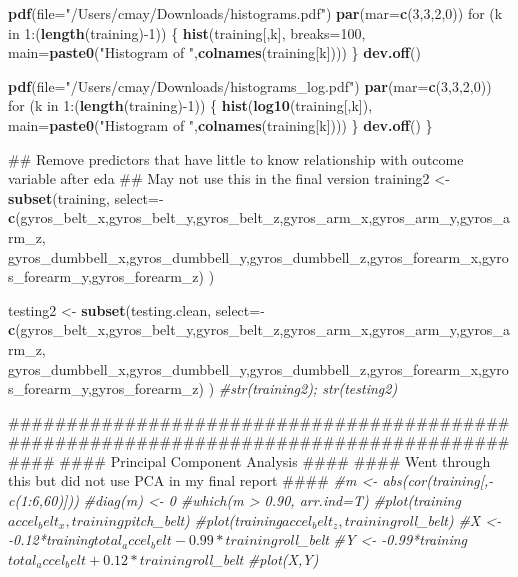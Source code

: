 \documentclass[]{article}
\newenvironment{Shaded}{\begin{snugshade}}{\end{snugshade}}
\newcommand{\KeywordTok}[1]{\textcolor[rgb]{0.13,0.29,0.53}{\textbf{{#1}}}}
\newcommand{\DataTypeTok}[1]{\textcolor[rgb]{0.13,0.29,0.53}{{#1}}}
\newcommand{\DecValTok}[1]{\textcolor[rgb]{0.00,0.00,0.81}{{#1}}}
\newcommand{\StringTok}[1]{\textcolor[rgb]{0.31,0.60,0.02}{{#1}}}
\newcommand{\CommentTok}[1]{\textcolor[rgb]{0.56,0.35,0.01}{\textit{{#1}}}}
\newcommand{\NormalTok}[1]{{#1}}
\begin{document}
\begin{Shaded}
\begin{Highlighting}[]
  \KeywordTok{pdf}\NormalTok{(}\DataTypeTok{file=}\StringTok{"/Users/cmay/Downloads/histograms.pdf"}\NormalTok{)}
  \KeywordTok{par}\NormalTok{(}\DataTypeTok{mar=}\KeywordTok{c}\NormalTok{(}\DecValTok{3}\NormalTok{,}\DecValTok{3}\NormalTok{,}\DecValTok{2}\NormalTok{,}\DecValTok{0}\NormalTok{))}
  \NormalTok{for (k in }\DecValTok{1}\NormalTok{:(}\KeywordTok{length}\NormalTok{(training)-}\DecValTok{1}\NormalTok{)) \{}
    \KeywordTok{hist}\NormalTok{(training[,k], }\DataTypeTok{breaks=}\DecValTok{100}\NormalTok{, }\DataTypeTok{main=}\KeywordTok{paste0}\NormalTok{(}\StringTok{"Histogram of "}\NormalTok{,}\KeywordTok{colnames}\NormalTok{(training[k])))}
  \NormalTok{\}}
  \KeywordTok{dev.off}\NormalTok{()}
  
  \KeywordTok{pdf}\NormalTok{(}\DataTypeTok{file=}\StringTok{"/Users/cmay/Downloads/histograms_log.pdf"}\NormalTok{)}
  \KeywordTok{par}\NormalTok{(}\DataTypeTok{mar=}\KeywordTok{c}\NormalTok{(}\DecValTok{3}\NormalTok{,}\DecValTok{3}\NormalTok{,}\DecValTok{2}\NormalTok{,}\DecValTok{0}\NormalTok{))}
  \NormalTok{for (k in }\DecValTok{1}\NormalTok{:(}\KeywordTok{length}\NormalTok{(training)-}\DecValTok{1}\NormalTok{)) \{}
    \KeywordTok{hist}\NormalTok{(}\KeywordTok{log10}\NormalTok{(training[,k]), }\DataTypeTok{main=}\KeywordTok{paste0}\NormalTok{(}\StringTok{"Histogram of "}\NormalTok{,}\KeywordTok{colnames}\NormalTok{(training[k])))}
  \NormalTok{\}}
  \KeywordTok{dev.off}\NormalTok{()}
\NormalTok{\}}


\NormalTok{## Remove predictors that have little to know relationship with outcome variable after eda}
\NormalTok{## May not use this in the final version}
\NormalTok{training2 <-}\StringTok{ }\KeywordTok{subset}\NormalTok{(training, }\DataTypeTok{select=}\NormalTok{-}\KeywordTok{c}\NormalTok{(gyros_belt_x,gyros_belt_y,gyros_belt_z,gyros_arm_x,gyros_arm_y,gyros_arm_z,}
                                        \NormalTok{gyros_dumbbell_x,gyros_dumbbell_y,gyros_dumbbell_z,gyros_forearm_x,gyros_forearm_y,gyros_forearm_z) )}

\NormalTok{testing2 <-}\StringTok{ }\KeywordTok{subset}\NormalTok{(testing.clean, }\DataTypeTok{select=}\NormalTok{-}\KeywordTok{c}\NormalTok{(gyros_belt_x,gyros_belt_y,gyros_belt_z,gyros_arm_x,gyros_arm_y,gyros_arm_z,}
                                            \NormalTok{gyros_dumbbell_x,gyros_dumbbell_y,gyros_dumbbell_z,gyros_forearm_x,gyros_forearm_y,gyros_forearm_z) )}
\CommentTok{#str(training2); str(testing2)}

\NormalTok{##########################################################################################}
\NormalTok{#### Principal Component Analysis ####}
\NormalTok{#### Went through this but did not use PCA in my final report ####}
\CommentTok{#m <- abs(cor(training[,-c(1:6,60)]))}
\CommentTok{#diag(m) <- 0}
\CommentTok{#which(m > 0.90, arr.ind=T)}
\CommentTok{#plot(training$accel_belt_x, training$pitch_belt)}
\CommentTok{#plot(training$accel_belt_z, training$roll_belt)}
\CommentTok{#X <- -0.12*training$total_accel_belt - 0.99*training$roll_belt}
\CommentTok{#Y <- -0.99*training$total_accel_belt + 0.12*training$roll_belt}
\CommentTok{#plot(X,Y)}


\end{Highlighting}
\end{Shaded}
\end{document}
